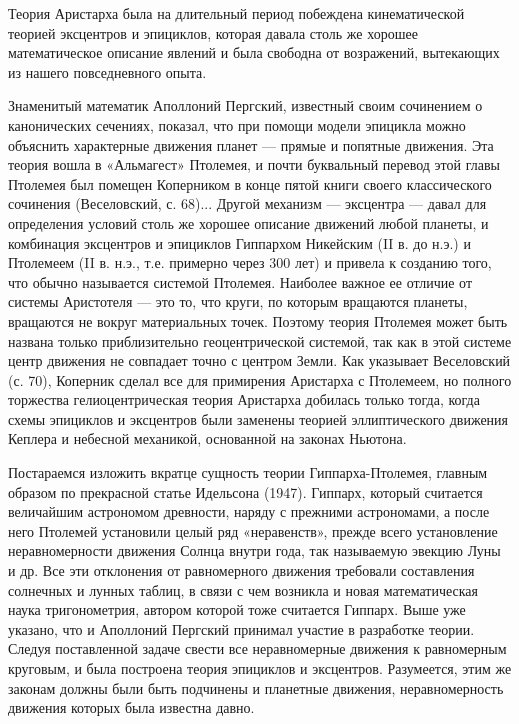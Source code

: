Теория Аристарха была на длительный период побеждена
кинематической теорией эксцентров и эпициклов, которая давала столь же
хорошее математическое описание явлений и была свободна от возражений,
вытекающих из нашего повседневного опыта.

Знаменитый математик Аполлоний Пергский, известный своим сочинением о
канонических сечениях, показал, что при помощи модели эпицикла можно
объяснить характерные движения планет --- прямые и попятные движения.
Эта теория вошла в «Альмагест» Птолемея, и почти буквальный перевод
этой главы Птолемея был помещен Коперником в конце пятой книги своего
классического сочинения (Веселовский, с. 68)... Другой механизм ---
эксцентра --- давал для определения условий столь же хорошее описание
движений любой планеты, и комбинация эксцентров и эпициклов Гиппархом
Никейским (II в. до н.э.) и Птолемеем (II в. н.э., т.е. примерно
через 300 лет) и привела к созданию того, что обычно называется
системой Птолемея. Наиболее важное ее отличие от системы Аристотеля
--- это то, что круги, по которым вращаются планеты, вращаются не
вокруг материальных точек. Поэтому теория Птолемея может быть названа
только приблизительно геоцентрической системой, так как в этой системе
центр движения не совпадает точно с центром Земли. Как указывает
Веселовский (с. 70), Коперник сделал все для примирения Аристарха с
Птолемеем, но полного торжества гелиоцентрическая теория Аристарха
добилась только тогда, когда схемы эпициклов и эксцентров были
заменены теорией эллиптического движения Кеплера и небесной механикой,
основанной на законах Ньютона.

Постараемся изложить вкратце сущность теории Гиппарха-Птолемея,
главным образом по прекрасной статье Идельсона (1947). Гиппарх,
который считается величайшим астрономом древности, наряду с прежними
астрономами, а после него Птолемей установили целый ряд «неравенств»,
прежде всего установление неравномерности движения Солнца внутри
года, так называемую эвекцию Луны и др. Все эти отклонения от
равномерного движения требовали составления солнечных и лунных таблиц,
в связи с чем возникла и новая математическая наука тригонометрия,
автором которой тоже считается Гиппарх. Выше уже указано, что и
Аполлоний Пергский принимал участие в разработке теории. Следуя
поставленной задаче свести все неравномерные движения к равномерным
круговым, и была построена теория эпициклов и эксцентров. Разумеется,
этим же законам должны были быть подчинены и планетные движения,
неравномерность движения которых была известна давно.

